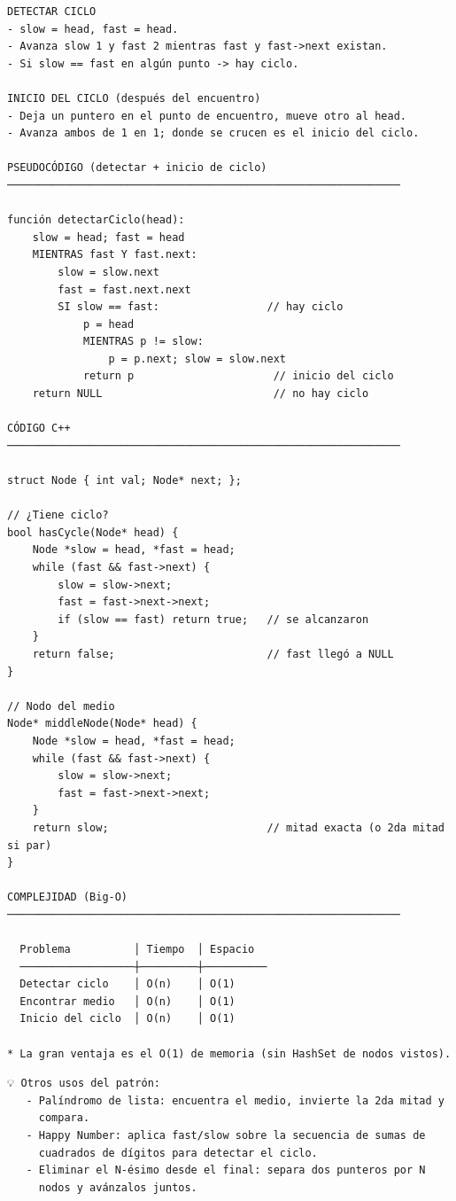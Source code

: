 \begin{lstlisting}
DETECTAR CICLO
- slow = head, fast = head.
- Avanza slow 1 y fast 2 mientras fast y fast->next existan.
- Si slow == fast en algún punto -> hay ciclo.

INICIO DEL CICLO (después del encuentro)
- Deja un puntero en el punto de encuentro, mueve otro al head.
- Avanza ambos de 1 en 1; donde se crucen es el inicio del ciclo.

PSEUDOCÓDIGO (detectar + inicio de ciclo)
──────────────────────────────────────────────────────────────

función detectarCiclo(head):
    slow = head; fast = head
    MIENTRAS fast Y fast.next:
        slow = slow.next
        fast = fast.next.next
        SI slow == fast:                 // hay ciclo
            p = head
            MIENTRAS p != slow:
                p = p.next; slow = slow.next
            return p                      // inicio del ciclo
    return NULL                           // no hay ciclo

CÓDIGO C++
──────────────────────────────────────────────────────────────

struct Node { int val; Node* next; };

// ¿Tiene ciclo?
bool hasCycle(Node* head) {
    Node *slow = head, *fast = head;
    while (fast && fast->next) {
        slow = slow->next;
        fast = fast->next->next;
        if (slow == fast) return true;   // se alcanzaron
    }
    return false;                        // fast llegó a NULL
}

// Nodo del medio
Node* middleNode(Node* head) {
    Node *slow = head, *fast = head;
    while (fast && fast->next) {
        slow = slow->next;
        fast = fast->next->next;
    }
    return slow;                         // mitad exacta (o 2da mitad si par)
}

COMPLEJIDAD (Big-O)
──────────────────────────────────────────────────────────────

  Problema          │ Tiempo  │ Espacio
  ──────────────────┼─────────┼──────────
  Detectar ciclo    │ O(n)    │ O(1)
  Encontrar medio   │ O(n)    │ O(1)
  Inicio del ciclo  │ O(n)    │ O(1)

* La gran ventaja es el O(1) de memoria (sin HashSet de nodos vistos).
\end{lstlisting}

\begin{lstlisting}
💡 Otros usos del patrón:
   - Palíndromo de lista: encuentra el medio, invierte la 2da mitad y
     compara.
   - Happy Number: aplica fast/slow sobre la secuencia de sumas de
     cuadrados de dígitos para detectar el ciclo.
   - Eliminar el N-ésimo desde el final: separa dos punteros por N
     nodos y avánzalos juntos.
\end{lstlisting}

